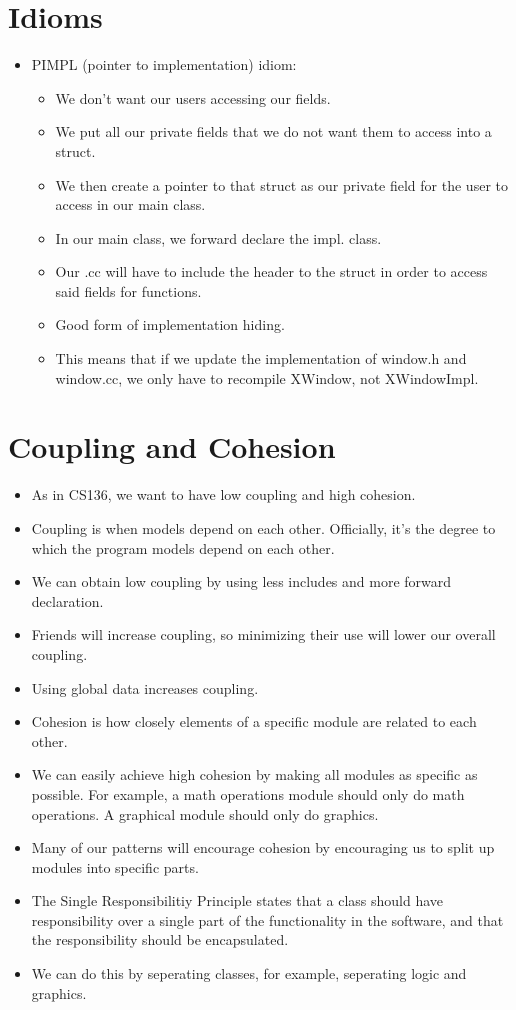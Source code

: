 \documentclass{article}
\begin{document}
\section{Idioms}
\begin{itemize}
\item PIMPL (pointer to implementation) idiom:
\begin{itemize}
\item We don't want our users accessing our fields.
\item We put all our private fields that we do not want them to access into a struct.
\item We then create a pointer to that struct as our private field for the user to access in our main class.
\item In our main class, we forward declare the impl. class.
\item Our .cc will have to include the header to the struct in order to access said fields for functions.
\item Good form of implementation hiding.
\item This means that if we update the implementation of window.h and window.cc, we only have to recompile XWindow, not XWindowImpl.
\end{itemize}
\end{itemize}

\section{Coupling and Cohesion}
\begin{itemize}
\item As in CS136, we want to have low coupling and high cohesion.
\item Coupling is when models depend on each other.  Officially, it's the degree to which the program models depend on each other.
\item We can obtain low coupling by using less includes and more forward declaration.
\item Friends will increase coupling, so minimizing their use will lower our overall coupling.
\item Using global data increases coupling.
\item Cohesion is how closely elements of a specific module are related to each other.
\item We can easily achieve high cohesion by making all modules as specific as possible.  For example, a math operations module should only do math operations.  A graphical module should only do graphics.
\item Many of our patterns will encourage cohesion by encouraging us to split up modules into specific parts.
\item The Single Responsibilitiy Principle states that a class should have responsibility over a single part of the functionality in the software, and that the responsibility should be encapsulated.
\item We can do this by seperating classes, for example, seperating logic and graphics.
\end{itemize}
\end{document}
